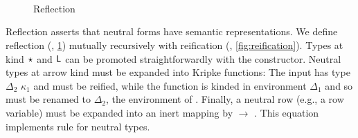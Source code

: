 \documentclass[sigplan,screen]{acmart}
\begin{document}
\begin{figure}[t]
\begin{AgdaAlign}
\begin{code}
\AgdaSymbol{\}}\AgdaSpace{}%
%
\>[27]\AgdaSymbol{=}\AgdaSpace{}%
\AgdaSpace{}%
\<%
\\
%
\>[2]\AgdaSpace{}%
\AgdaSymbol{\{}\AgdaSpace{}%
\AgdaSymbol{=}\AgdaSpace{}%
\AgdaSpace{}%
\AgdaSpace{}%
\AgdaSymbol{\}}\AgdaSpace{}%
\AgdaSpace{}%
\AgdaSymbol{=}\AgdaSpace{}%
\AgdaSpace{}%
\AgdaSpace{}%
\AgdaSpace{}%
\AgdaSpace{}%
\AgdaSpace{}%
\AgdaSymbol{(}\AgdaSpace{}%
\AgdaSpace{}%
\AgdaSpace{}%
\AgdaSpace{}%
\AgdaSpace{}%
\AgdaSymbol{)}\<%
\\
%
\>[2]\AgdaSpace{}%
\AgdaSymbol{\{}\AgdaSpace{}%
\AgdaSymbol{=}\AgdaSpace{}%
\AgdaOperator{\AgdaInductiveConstructor{R[}}\AgdaSpace{}%
\AgdaSpace{}%
\AgdaOperator{\AgdaInductiveConstructor{]}}\AgdaSymbol{\}}\AgdaSpace{}%
%
\>[27]\AgdaSymbol{=}\AgdaSpace{}%
\AgdaSpace{}%
\AgdaSpace{}%
\AgdaSpace{}%
\AgdaSymbol{)}\AgdaSpace{}%
\AgdaOperator{\AgdaInductiveConstructor{\$}}\AgdaSpace{}%
\<%
\end{code}
\begin{code}[hide]%
%
\>[2]\AgdaSpace{}%
\AgdaSpace{}%
\AgdaSpace{}%
\<%
\\
%
\>[2]\AgdaSpace{}%
\AgdaSymbol{=}\AgdaSpace{}%
\<%
\end{code}
\end{AgdaAlign}
\caption{Reflection}
\label{fig:reflection}
\end{figure}

Reflection asserts that neutral forms have semantic representations. We define reflection (, \cref{fig:reflection}) mutually recursively with reification (, \cref{fig:reification}). Types at kind $\star_{}$ and $\mathsf{L}$ can be promoted straightforwardly with the  constructor. Neutral types at arrow kind must be expanded into Kripke functions: The input  has type  $\Delta_2$ $\kappa_1$ and must be reified, while the function  is kinded in environment $\Delta_1$ and so must be renamed to $\Delta_2$, the environment of . Finally, a neutral row (e.g., a row variable) must be expanded into an inert mapping by \Symbol{(}  $\to$ \Symbol{)}. This equation implements rule  for neutral types.
\end{document}
